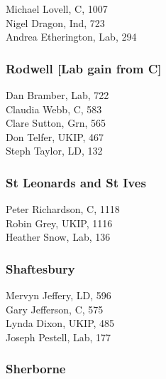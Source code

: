 \documentclass[a4paper,openany,10pt]{book}
\begin{document}


Michael Lovell, C, 1007\\
Nigel Dragon, Ind, 723\\
Andrea Etherington, Lab, 294\\


\subsubsection*{Rodwell \hspace*{\fill}\nolinebreak[1]%
\enspace\hspace*{\fill}
[Lab gain from C]}



Dan Bramber, Lab, 722\\
Claudia Webb, C, 583\\
Clare Sutton, Grn, 565\\
Don Telfer, UKIP, 467\\
Steph Taylor, LD, 132\\


\subsubsection*{St Leonards and St Ives}



Peter Richardson, C, 1118\\
Robin Grey, UKIP, 1116\\
Heather Snow, Lab, 136\\


\subsubsection*{Shaftesbury}



Mervyn Jeffery, LD, 596\\
Gary Jefferson, C, 575\\
Lynda Dixon, UKIP, 485\\
Joseph Pestell, Lab, 177\\


\subsubsection*{Sherborne}
\end{document}
